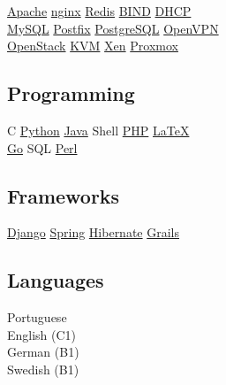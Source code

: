 \documentclass[]{willianpaixao-resume}
\begin{document}
\begin{minipage}[t]{0.35\textwidth}
\href{https://httpd.apache.org/}{Apache}\textbullet{}
\href{https://nginx.org/}{nginx}\textbullet{}
\href{https://redis.io/}{Redis}\textbullet{}
\href{https://www.isc.org/bind/}{BIND}\textbullet{}
\href{https://www.isc.org/dhcp/}{DHCP}\\
\href{https://www.mysql.com/}{MySQL}\textbullet{}
\href{https://www.postfix.org/}{Postfix}\textbullet{}
\href{https://www.postgresql.org/}{PostgreSQL}\textbullet{}
\href{https://openvpn.net/}{OpenVPN}\\
\href{https://www.openstack.org/}{OpenStack}\textbullet{}
\href{https://linux-kvm.org/}{KVM}\textbullet{}
\href{https://xenproject.org/}{Xen} \textbullet{}
\href{https://www.proxmox.com/}{Proxmox}\\
\sectionsep

\subsection{Programming}
C\textbullet
\href{http://www.python.org}{Python}\textbullet{}
\href{https://www.oracle.com/java/}{Java}\textbullet{}
Shell\textbullet{}
\href{https://www.php.net/}{PHP}\textbullet{}
\href{https://www.latex-project.org/}{\LaTeX}\\
\href{https://go.dev/}{Go}\textbullet{}
SQL\textbullet{}
\href{https://www.perl.org/}{Perl}
\sectionsep

\subsection{Frameworks}
\href{https://www.djangoproject.com/}{Django}\textbullet{}
\href{https://spring.io/}{Spring}\textbullet{}
\href{http://hibernate.org/}{Hibernate}\textbullet{}
\href{https://grails.org/}{Grails}
\sectionsep

\subsection{Languages}
Portuguese\\
English (C1)\\
German (B1)\\
Swedish (B1)


\end{minipage} 
\end{document}
